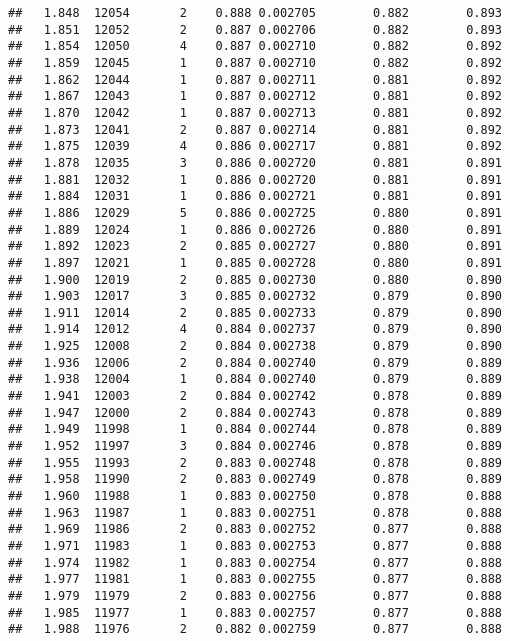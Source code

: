 \documentclass[
]{book}
\begin{document}
\begin{verbatim}
##   1.848  12054       2    0.888 0.002705        0.882        0.893
##   1.851  12052       2    0.887 0.002706        0.882        0.893
##   1.854  12050       4    0.887 0.002710        0.882        0.892
##   1.859  12045       1    0.887 0.002710        0.882        0.892
##   1.862  12044       1    0.887 0.002711        0.881        0.892
##   1.867  12043       1    0.887 0.002712        0.881        0.892
##   1.870  12042       1    0.887 0.002713        0.881        0.892
##   1.873  12041       2    0.887 0.002714        0.881        0.892
##   1.875  12039       4    0.886 0.002717        0.881        0.892
##   1.878  12035       3    0.886 0.002720        0.881        0.891
##   1.881  12032       1    0.886 0.002720        0.881        0.891
##   1.884  12031       1    0.886 0.002721        0.881        0.891
##   1.886  12029       5    0.886 0.002725        0.880        0.891
##   1.889  12024       1    0.886 0.002726        0.880        0.891
##   1.892  12023       2    0.885 0.002727        0.880        0.891
##   1.897  12021       1    0.885 0.002728        0.880        0.891
##   1.900  12019       2    0.885 0.002730        0.880        0.890
##   1.903  12017       3    0.885 0.002732        0.879        0.890
##   1.911  12014       2    0.885 0.002733        0.879        0.890
##   1.914  12012       4    0.884 0.002737        0.879        0.890
##   1.925  12008       2    0.884 0.002738        0.879        0.890
##   1.936  12006       2    0.884 0.002740        0.879        0.889
##   1.938  12004       1    0.884 0.002740        0.879        0.889
##   1.941  12003       2    0.884 0.002742        0.878        0.889
##   1.947  12000       2    0.884 0.002743        0.878        0.889
##   1.949  11998       1    0.884 0.002744        0.878        0.889
##   1.952  11997       3    0.884 0.002746        0.878        0.889
##   1.955  11993       2    0.883 0.002748        0.878        0.889
##   1.958  11990       2    0.883 0.002749        0.878        0.889
##   1.960  11988       1    0.883 0.002750        0.878        0.888
##   1.963  11987       1    0.883 0.002751        0.878        0.888
##   1.969  11986       2    0.883 0.002752        0.877        0.888
##   1.971  11983       1    0.883 0.002753        0.877        0.888
##   1.974  11982       1    0.883 0.002754        0.877        0.888
##   1.977  11981       1    0.883 0.002755        0.877        0.888
##   1.979  11979       2    0.883 0.002756        0.877        0.888
##   1.985  11977       1    0.883 0.002757        0.877        0.888
##   1.988  11976       2    0.882 0.002759        0.877        0.888

\end{verbatim}
\end{document}
